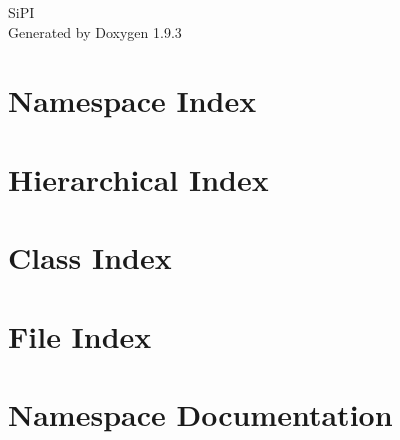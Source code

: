 \documentclass[twoside]{book}
\newcommand{\+}{\discretionary{\mbox{\scriptsize$\hookleftarrow$}}{}{}}
\newcommand{\clearemptydoublepage}{%
    \newpage{\pagestyle{empty}\cleardoublepage}%
  }
\begin{document}
  \raggedbottom
    \hypersetup{pageanchor=false,
                bookmarksnumbered=true,
                pdfencoding=unicode
               }
  \begin{titlepage}
  \vspace*{7cm}
  \begin{center}%
  {\Large Si\+PI}\\
  \vspace*{1cm}
  {\large Generated by Doxygen 1.9.3}\\
  \end{center}
  \end{titlepage}
  \clearemptydoublepage
  \tableofcontents
  \clearemptydoublepage
  \hypersetup{pageanchor=true}
\chapter{Namespace Index}

\chapter{Hierarchical Index}

\chapter{Class Index}

\chapter{File Index}

\chapter{Namespace Documentation}








\end{document}
